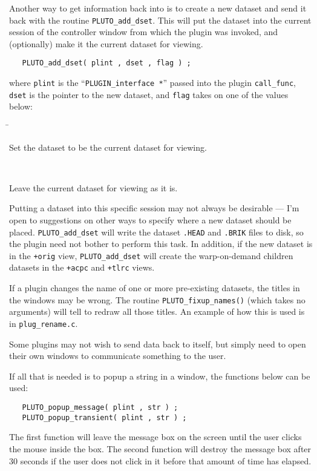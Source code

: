 Another way to get information back into \afnit
is to create a new dataset and send it back with the
routine {\tt PLUTO\_add\_dset}.  This will put the dataset into
the current session of the \afnit controller window from which the
plugin was invoked, and (optionally) make it the current dataset for
viewing.
\begin{samepage}\begin{verbatim}
   PLUTO_add_dset( plint , dset , flag ) ;
\end{verbatim}\end{samepage}
where {\tt plint} is the ``{\tt PLUGIN\_interface *}'' passed into
the plugin {\tt call\_func}, {\tt dset} is the pointer to the
new dataset, and {\tt flag} takes on one of the values below:
\begin{tabbing}
   \blob \=
      \parbox[t]{4in}{Set the dataset to be the current dataset for viewing.} \\[.5ex]
   \>
      \parbox[t]{4in}{Leave the current dataset for viewing as it is.}
\end{tabbing}
Putting a dataset into this specific session
may not always be desirable --- I'm open
to suggestions on other ways to specify where a new dataset should be
placed. {\tt PLUTO\_add\_dset} will write the dataset {\tt .HEAD} and
{\tt .BRIK} files to disk, so
the plugin need not bother to perform this task.
In addition, if the new dataset is in the {\tt +orig} view, {\tt PLUTO\_add\_dset}
will create the warp-on-demand children datasets in the {\tt +acpc} and {\tt +tlrc}
views.

If a plugin changes the name of one or more pre-existing datasets, the titles in the
\afnit windows may be wrong.  The routine {\tt PLUTO\_fixup\_names()}
(which takes no arguments)
will tell \afnit to redraw all those titles.  An example of how this is used
is in {\tt plug\_rename.c}.

Some plugins may not wish to send data back to \afnit itself, but
simply need to open their own windows to communicate something
to the user.

If all that is needed is
to popup a string in a window, the functions below can be used:
\begin{samepage}\begin{verbatim}
   PLUTO_popup_message( plint , str ) ;
   PLUTO_popup_transient( plint , str ) ;
\end{verbatim}\end{samepage}
The first function will leave the message box on the screen until
the user clicks the mouse inside the box.  The second function
will destroy the message box after 30 seconds if the user does
not click in it before that amount of time has elapsed.

